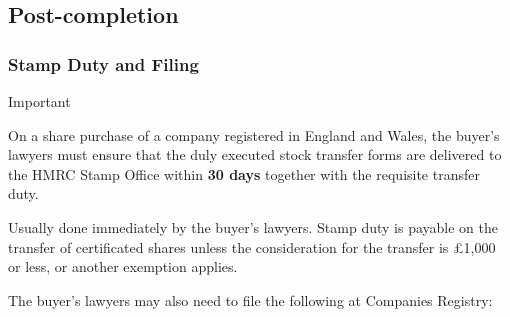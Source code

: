 \documentclass[
]{article}
\newenvironment{env-8890de02-1ba1-42c2-9b89-cb105d97c320}
{
    \savenotes\tcolorbox[blanker,breakable,left=5pt,borderline west={2pt}{-4pt}{cyan}]
}
{
    \endtcolorbox\spewnotes
}
\begin{document}
\hypertarget{post-completion}{%
\subsection{Post-completion}\label{post-completion}}

\hypertarget{stamp-duty-and-filing}{%
\subsubsection{Stamp Duty and Filing}\label{stamp-duty-and-filing}}

\begin{env-8890de02-1ba1-42c2-9b89-cb105d97c320}

Important

On a share purchase of a company registered in England and Wales, the
buyer's lawyers must ensure that the duly executed stock transfer forms
are delivered to the HMRC Stamp Office within \textbf{30 days} together
with the requisite transfer duty.

\end{env-8890de02-1ba1-42c2-9b89-cb105d97c320}

Usually done immediately by the buyer's lawyers. Stamp duty is payable
on the transfer of certificated shares unless the consideration for the
transfer is £1,000 or less, or another exemption applies.

The buyer's lawyers may also need to file the following at Companies
Registry:
\end{document}
